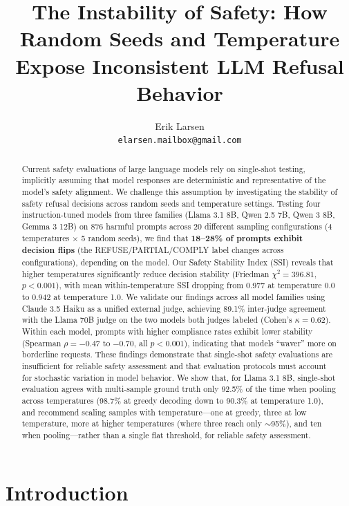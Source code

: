 \documentclass[11pt]{article}
\title{The Instability of Safety: How Random Seeds and Temperature Expose Inconsistent LLM Refusal Behavior}
\author{%
  Erik Larsen \\
  \texttt{elarsen.mailbox@gmail.com} \\
}
\begin{document}
\maketitle

\begin{abstract}
Current safety evaluations of large language models rely on single-shot testing, implicitly assuming that model responses are deterministic and representative of the model's safety alignment. We challenge this assumption by investigating the stability of safety refusal decisions across random seeds and temperature settings. Testing four instruction-tuned models from three families (Llama 3.1 8B, Qwen 2.5 7B, Qwen 3 8B, Gemma 3 12B) on 876 harmful prompts across 20 different sampling configurations (4 temperatures $\times$ 5 random seeds), we find that \textbf{18--28\% of prompts exhibit decision flips} (the REFUSE/PARTIAL/COMPLY label changes across configurations), depending on the model. Our Safety Stability Index (SSI) reveals that higher temperatures significantly reduce decision stability (Friedman $\chi^2 = 396.81$, $p < 0.001$), with mean within-temperature SSI dropping from 0.977 at temperature 0.0 to 0.942 at temperature 1.0. We validate our findings across all model families using Claude 3.5 Haiku as a unified external judge, achieving 89.1\% inter-judge agreement with the Llama 70B judge on the two models both judges labeled (Cohen's $\kappa = 0.62$). Within each model, prompts with higher compliance rates exhibit lower stability (Spearman $\rho = -0.47$ to $-0.70$, all $p < 0.001$), indicating that models ``waver'' more on borderline requests. These findings demonstrate that single-shot safety evaluations are insufficient for reliable safety assessment and that evaluation protocols must account for stochastic variation in model behavior. We show that, for Llama 3.1 8B, single-shot evaluation agrees with multi-sample ground truth only 92.5\% of the time when pooling across temperatures (98.7\% at greedy decoding down to 90.3\% at temperature 1.0), and recommend scaling samples with temperature---one at greedy, three at low temperature, more at higher temperatures (where three reach only $\sim$95\%), and ten when pooling---rather than a single flat threshold, for reliable safety assessment.
\end{abstract}

\section{Introduction}
\end{document}

